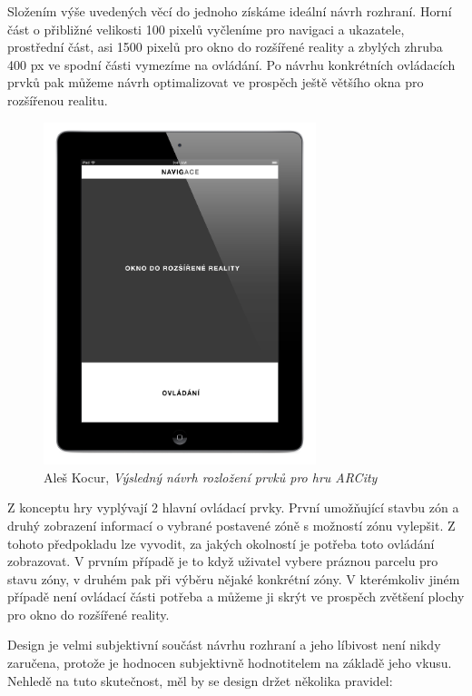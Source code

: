 \documentclass[twoside,12pt]{article}
\begin{document}
Složením výše uvedených věcí do jednoho získáme ideální návrh rozhraní. Horní část o přibližné velikosti 100 pixelů vyčleníme pro navigaci a ukazatele, prostřední část, asi 1500 pixelů pro okno do rozšířené reality a zbylých zhruba 400 px ve spodní části vymezíme na ovládání. Po návrhu konkrétních ovládacích prvků pak můžeme návrh optimalizovat ve prospěch ještě většího okna pro rozšířenou realitu.

\begin{figure}[H]
\centering
    \includegraphics[width=300px, center]{images/ipad_layout_ux.jpg}
\captionsetup{justification=centering}
    \caption{Aleš Kocur, \textit{Výsledný návrh rozložení prvků pro hru ARCity}}
    \label{class_diagram}
\end{figure}

Z konceptu hry vyplývají 2 hlavní ovládací prvky. První umožňující stavbu zón a druhý zobrazení informací o vybrané postavené zóně s možností zónu vylepšit. Z tohoto předpokladu lze vyvodit, za jakých okolností je potřeba toto ovládání zobrazovat. V prvním případě je to když uživatel vybere práznou parcelu pro stavu zóny, v druhém pak při výběru nějaké konkrétní zóny. V kterémkoliv jiném případě není ovládací části potřeba a můžeme ji skrýt ve prospěch zvětšení plochy pro okno do rozšířené reality.

\newpage


Design je velmi subjektivní součást návrhu rozhraní a jeho líbivost není nikdy zaručena, protože je hodnocen subjektivně hodnotitelem na základě jeho vkusu. Nehledě na tuto skutečnost, měl by se design držet několika pravidel:
\end{document}
